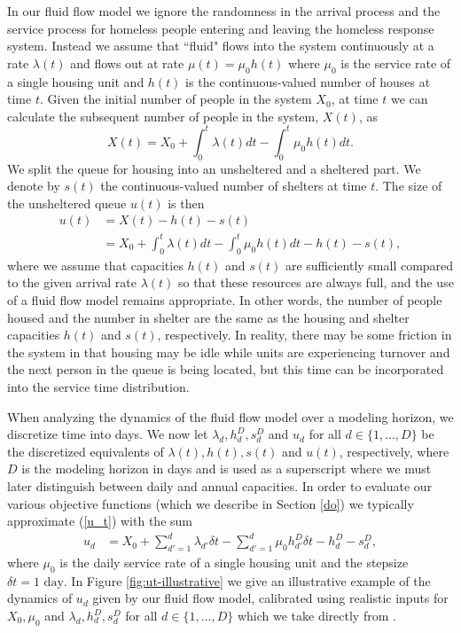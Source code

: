 \documentclass{article}
\begin{document}
In our fluid flow model we ignore the randomness in the arrival process and the service process for homeless people entering and leaving the homeless response system. Instead we assume that ``fluid" flows into the system continuously at a rate $\lambda(t)$ and flows out at  rate $\mu(t) = \mu_{0}h(t)$ where $\mu_{0}$ is the service rate of a single housing unit and $h(t)$ is the continuous-valued number of houses at time $t$. Given the initial number of people in the system $X_0$, at time $t$ we can calculate the subsequent number of people in the system, $X(t)$, as
%
\begin{equation*} \label{x_t}
X(t) = X_0 + \int_{0}^{t} \lambda(t) dt - \int_{0}^{t} \mu_0 h(t) dt.
\end{equation*}
%
We split the queue for housing into an unsheltered and a sheltered part. We denote by $s(t)$ the continuous-valued number of shelters at time $t$. The size of the unsheltered queue $u(t)$ is then 
%
\begin{align} 
u(t) & = X(t) - h(t) - s(t) \\
& = X_0 + \int_{0}^{t} \lambda(t) dt - \int_{0}^{t} \mu_0 h(t) dt - h(t) - s(t),
\label{u_t}
\end{align}
%
where we assume that capacities $h(t)$ and $s(t)$ are sufficiently small compared to the given arrival rate $\lambda(t)$ so that these resources are always full, and the use of a fluid flow model remains appropriate. In other words, the number of people housed and the number in shelter are the same as the housing and shelter capacities $h(t)$ and $s(t)$, respectively. In reality, there may be some friction in the system in that housing may be idle while units are experiencing turnover and the next person in the queue is being located, but this time can be incorporated into the service time distribution.

When analyzing the dynamics of the fluid flow model over a modeling horizon, we discretize time into days. We now let $\lambda_d, h^D_d, s^D_d$ and $u_d$ for all $d \in \{1,...,D\}$ be the discretized equivalents of $\lambda(t), h(t), s(t)$ and $u(t)$, respectively, where $D$ is the modeling horizon in days and is used as a superscript where we must later distinguish between daily and annual capacities. In order to evaluate our various objective functions (which we describe in Section \ref{do}) we typically approximate (\ref{u_t}) with the sum 
%
\begin{align} \label{u_t_discrete}
u_d & = X_0 + \sum_{d'=1}^{d} \lambda_{d'} \delta t - \sum_{d'=1}^{d} \mu_0 h^D_{d'} \delta t - h^D_d - s^D_d, 
\end{align}
where $\mu_0$ is the daily service rate of a single housing unit and the stepsize $\delta t = 1 \text{ day}$. In Figure \ref{fig:ut-illustrative} we give an illustrative example of the dynamics of $u_d$ given by our fluid flow model, calibrated using realistic inputs for $X_0, \mu_0$ and $\lambda_d, h^D_d, s^D_d$ for all $d \in \{1,...,D\}$ which we take directly from \cite{singham2023discrete}. 
\end{document}
